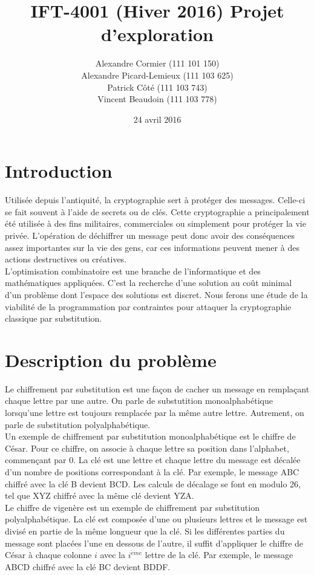 \documentclass[11pt]{article}
\title{IFT-4001 (Hiver 2016) Projet d'exploration}
\date{24 avril 2016}
\author{Alexandre Cormier (111 101 150)\\Alexandre Picard-Lemieux (111 103 625)\\Patrick Côté (111 103 743)\\Vincent Beaudoin (111 103 778)}
\begin{document}
	\maketitle
	\newpage

	\section{Introduction}

		Utilisée depuis l'antiquité, la cryptographie sert à protéger des messages. Celle-ci se fait souvent à l'aide de secrets ou de clés. Cette cryptographie a principalement été utilisée à des fins militaires, commerciales ou simplement pour protéger la vie privée. L'opération de déchiffrer un message peut donc avoir des conséquences assez importantes sur la vie des gens, car ces informations peuvent mener à des actions destructives ou créatives.\\

		L'optimisation combinatoire est une branche de l'informatique et des mathématiques appliquées. C'est la recherche d'une solution au coût minimal d'un problème dont l'espace des solutions est discret. Nous ferons une étude de la viabilité de la programmation par contraintes pour attaquer la cryptographie classique par substitution.\\

	\section{Description du problème}

		Le chiffrement par substitution est une façon de cacher un message en remplaçant chaque lettre par une autre. On parle de substutition monoalphabétique lorsqu'une lettre est toujours remplacée par la même autre lettre. Autrement, on parle de substitution polyalphabétique.\\

		Un exemple de chiffrement par substitution monoalphabétique est le chiffre de César. Pour ce chiffre, on associe à chaque lettre sa position dans l'alphabet, commençant par 0. La clé est une lettre et chaque lettre du message est décalée d'un nombre de positions correspondant à la clé. Par exemple, le message ABC chiffré avec la clé B devient BCD. Les calculs de décalage se font en modulo 26, tel que XYZ chiffré avec la même clé devient YZA.\\

		Le chiffre de vigenère est un exemple de chiffrement par substitution polyalphabétique. La clé est composée d'une ou plusieurs lettres et le message est divisé en partie de la même longueur que la clé. Si les différentes parties du message sont placées l'une en dessous de l'autre, il suffit d'appliquer le chiffre de César à chaque colonne $i$ avec la $i^{\grave{e}me}$ lettre de la clé. Par exemple, le message ABCD chiffré avec la clé BC devient BDDF.\\
\end{document}
